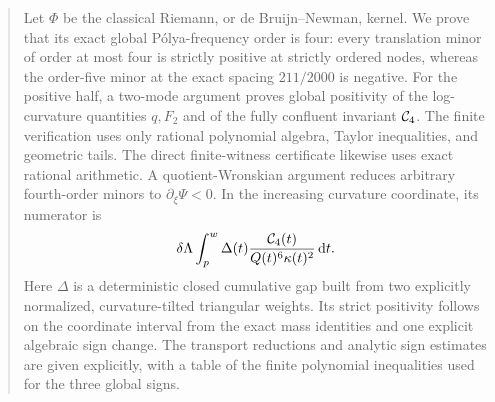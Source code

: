 \begin{abstract}
Let \(\Phi\) be the classical Riemann, or de Bruijn--Newman, kernel. We prove
that its exact global P\'olya-frequency order is four: every translation minor
of order at most four is strictly positive at strictly ordered nodes, whereas
the order-five minor at the exact spacing \(211/2000\) is negative. For the
positive half, a two-mode
argument proves global positivity of the log-curvature quantities \(q,F_2\)
and of the fully confluent invariant \(\Cfour\). The finite verification uses
only rational polynomial algebra, Taylor inequalities, and geometric tails.
The direct finite-witness certificate likewise uses exact rational arithmetic.
A
quotient-Wronskian argument reduces arbitrary fourth-order minors to
\(\partial_\xi\Psi<0\). In the increasing curvature coordinate, its numerator
is
\[
 \delta\Lambda\int_p^w
 \Delta(t)\frac{\Cfour(t)}{Q(t)^6\kappa(t)^2}\dd t.
\]
Here \(\Delta\) is a deterministic closed cumulative gap built from two
explicitly normalized, curvature-tilted triangular weights. Its strict
positivity follows on the coordinate interval from the exact mass identities
and one explicit algebraic sign change. The transport
reductions and analytic sign estimates are given explicitly, with a table of
the finite polynomial inequalities used for the three global signs.
\end{abstract}
